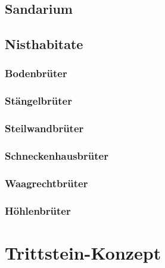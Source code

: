 \documentclass[
]{book}
\begin{document}
\hypertarget{sandarium}{%
\subsection{Sandarium}\label{sandarium}}

\hypertarget{nisthabitate}{%
\subsection{Nisthabitate}\label{nisthabitate}}

\hypertarget{bodenbruxfcter}{%
\subsubsection{Bodenbrüter}\label{bodenbruxfcter}}

\hypertarget{stuxe4ngelbruxfcter}{%
\subsubsection{Stängelbrüter}\label{stuxe4ngelbruxfcter}}

\hypertarget{steilwandbruxfcter}{%
\subsubsection{Steilwandbrüter}\label{steilwandbruxfcter}}

\hypertarget{schneckenhausbruxfcter}{%
\subsubsection{Schneckenhausbrüter}\label{schneckenhausbruxfcter}}

\hypertarget{waagrechtbruxfcter}{%
\subsubsection{Waagrechtbrüter}\label{waagrechtbruxfcter}}

\hypertarget{huxf6hlenbruxfcter}{%
\subsubsection{Höhlenbrüter}\label{huxf6hlenbruxfcter}}

\hypertarget{trittstein-konzept}{%
\section{Trittstein-Konzept}\label{trittstein-konzept}}
\end{document}
